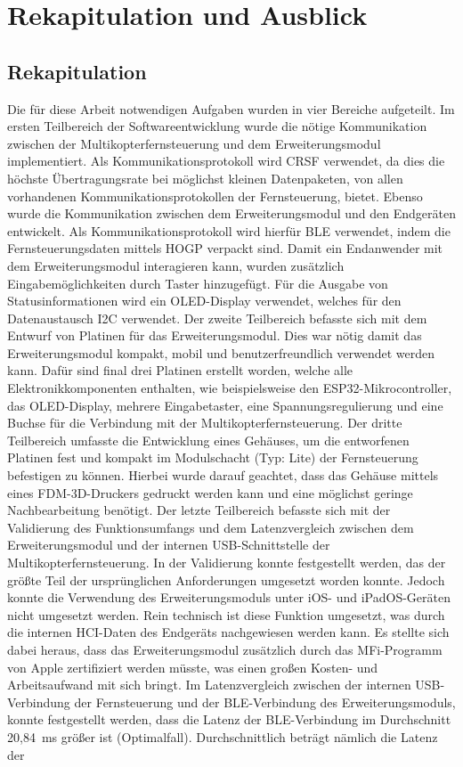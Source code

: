 
\chapter{Rekapitulation und Ausblick}
\section{Rekapitulation}

Die für diese Arbeit notwendigen Aufgaben wurden in vier Bereiche aufgeteilt. Im ersten Teilbereich der Softwareentwicklung wurde die nötige Kommunikation zwischen der Multikopterfernsteuerung und dem Erweiterungsmodul implementiert. Als Kommunikationsprotokoll wird CRSF verwendet, da dies die höchste Übertragungsrate bei möglichst kleinen Datenpaketen, von allen vorhandenen Kommunikationsprotokollen der Fernsteuerung, bietet. Ebenso wurde die Kommunikation zwischen dem Erweiterungsmodul und den Endgeräten entwickelt. Als Kommunikationsprotokoll wird hierfür \ac{BLE} verwendet, indem die Fernsteuerungsdaten mittels \ac{HOGP} verpackt sind. Damit ein Endanwender mit dem Erweiterungsmodul interagieren kann, wurden zusätzlich Eingabemöglichkeiten durch Taster hinzugefügt. Für die Ausgabe von Statusinformationen wird ein \acs{OLED}-Display verwendet, welches für den Datenaustausch \ac{I2C} verwendet. Der zweite Teilbereich befasste sich mit dem Entwurf von Platinen für das Erweiterungsmodul. Dies war nötig damit das Erweiterungsmodul kompakt, mobil und benutzerfreundlich verwendet werden kann. Dafür sind final drei Platinen erstellt worden, welche alle Elektronikkomponenten enthalten, wie beispielsweise den ESP32-Mikrocontroller, das \acs{OLED}-Display, mehrere Eingabetaster, eine Spannungsregulierung und eine Buchse für die Verbindung mit der Multikopterfernsteuerung. Der dritte Teilbereich umfasste die Entwicklung eines Gehäuses, um die entworfenen Platinen fest und kompakt im Modulschacht (Typ: Lite) der Fernsteuerung befestigen zu können. Hierbei wurde darauf geachtet, dass das Gehäuse mittels eines \ac{FDM}-3D-Druckers gedruckt werden kann und eine möglichst geringe Nachbearbeitung benötigt. Der letzte Teilbereich befasste sich mit der Validierung des Funktionsumfangs und dem Latenzvergleich zwischen dem Erweiterungsmodul und der internen USB-Schnittstelle der Multikopterfernsteuerung. In der Validierung konnte festgestellt werden, das der größte Teil der ursprünglichen Anforderungen umgesetzt worden konnte. Jedoch konnte die Verwendung des Erweiterungsmoduls unter iOS- und iPadOS-Geräten nicht umgesetzt werden. Rein technisch ist diese Funktion umgesetzt, was durch die internen \ac{HCI}-Daten des Endgeräts nachgewiesen werden kann. Es stellte sich dabei heraus, dass das Erweiterungsmodul zusätzlich durch das \ac{MFi}-Programm von Apple zertifiziert werden müsste, was einen großen Kosten- und Arbeitsaufwand mit sich bringt. Im Latenzvergleich zwischen der internen USB-Verbindung der Fernsteuerung und der \ac{BLE}-Verbindung des Erweiterungsmoduls, konnte festgestellt werden, dass die Latenz der \ac{BLE}-Verbindung im Durchschnitt 20,84~ms größer ist (Optimalfall). Durchschnittlich beträgt nämlich die Latenz der 
